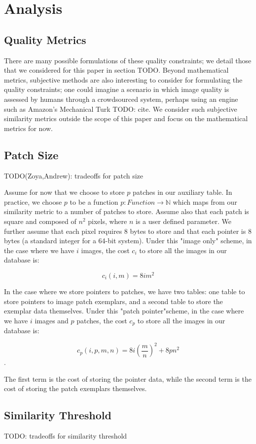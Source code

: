 \section{Analysis}\label{sec:analysis}

\subsection{Quality Metrics}\label{ssec:qual-met}
There are many possible formulations of these quality constraints; we detail those that we considered for this paper in section TODO.  Beyond mathematical metrics, subjective methods are also interesting to consider for formulating the quality constraints; one could imagine a scenario in which image quality is assessed by humans through a crowdsourced system, perhaps using an engine such as Amazon's Mechanical Turk TODO: cite.  We consider such subjective similarity metrics outside the scope of this paper and focus on the mathematical metrics for now.


\subsection{Patch Size}

TODO(Zoya,Andrew): tradeoffs for patch size

Assume for now that we choose to store $p$ patches in our auxiliary table.  In practice, we choose $p$ to be a function $p \colon Function \to \mathds{N}$ which maps from our similarity metric to a number of patches to store.  Assume also that each patch is square and composed of $n^2$ pixels, where $n$ is a user defined parameter.  We further assume that each pixel requires 8 bytes to store  and that each pointer is 8 bytes (a standard integer for a 64-bit system).  Under this "image only" scheme, in the case where we have $i$ images, the cost $c_i$ to store all the images in our database is:

\begin{equation}
	c_i(i, m) = 8  i  m^2
\end{equation}

In the case where we store pointers to patches, we have two tables: one table to store pointers to image patch exemplars, and a second table to store the exemplar data themselves.  Under this "patch pointer"scheme, in the case where we have $i$ images and $p$ patches, the cost $c_p$ to store all the images in our database is:

\begin{equation}
	c_p(i, p, m, n) = 8 i (\frac{m}{n})^2 + 8  p  n^2
\end{equation}.

The first term is the cost of storing the pointer data, while the second term is the cost of storing the patch exemplars themselves.

\subsection{Similarity Threshold}

TODO: tradeoffs for similarity threshold
